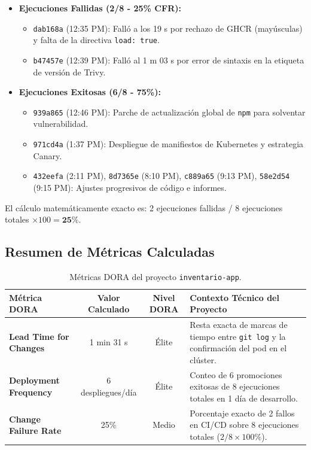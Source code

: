\documentclass[11pt,a4paper]{article}
\begin{document}
\begin{itemize}[leftmargin=*]
    \item \textbf{Ejecuciones Fallidas (2/8 - 25\% CFR):}
    \begin{itemize}
        \item \texttt{dab168a} (12:35 PM): Falló a los 19 s por rechazo de GHCR (mayúsculas) y falta de la directiva \texttt{load: true}.
        \item \texttt{b47457e} (12:39 PM): Falló al 1 m 03 s por error de sintaxis en la etiqueta de versión de Trivy.
    \end{itemize}
    \item \textbf{Ejecuciones Exitosas (6/8 - 75\%):}
    \begin{itemize}
        \item \texttt{939a865} (12:46 PM): Parche de actualización global de \texttt{npm} para solventar vulnerabilidad.
        \item \texttt{971cd4a} (1:37 PM): Despliegue de manifiestos de Kubernetes y estrategia Canary.
        \item \texttt{432eefa} (2:11 PM), \texttt{8d7365e} (8:10 PM), \texttt{c889a65} (9:13 PM), \texttt{58e2d54} (9:15 PM): Ajustes progresivos de código e informes.
    \end{itemize}
\end{itemize}

El cálculo matemáticamente exacto es: 2 ejecuciones fallidas / 8 ejecuciones totales $\times 100 = \mathbf{25\%}$.

\subsection{Resumen de Métricas Calculadas}

\begin{table}[H]
\centering
\small
\renewcommand{\arraystretch}{1.3}
\begin{tabularx}{\textwidth}{>{\bfseries}l c c X}
\toprule
\color{navyblue} Métrica DORA & \color{navyblue} Valor Calculado & \color{navyblue} Nivel DORA & \color{navyblue} Contexto Técnico del Proyecto \\
\midrule
Lead Time for Changes & 1 min 31 s & Élite & Resta exacta de marcas de tiempo entre \texttt{git log} y la confirmación del pod en el clúster. \\
\addlinespace
Deployment Frequency & 6 despliegues/día & Élite & Conteo de 6 promociones exitosas de 8 ejecuciones totales en 1 día de desarrollo. \\
\addlinespace
Change Failure Rate & 25\% & Medio & Porcentaje exacto de 2 fallos en CI/CD sobre 8 ejecuciones totales ($2/8 \times 100\%$). \\
\bottomrule
\end{tabularx}
\caption{Métricas DORA del proyecto \texttt{inventario-app}.}
\label{tab:dora_metrics}
\end{table}
\end{document}
